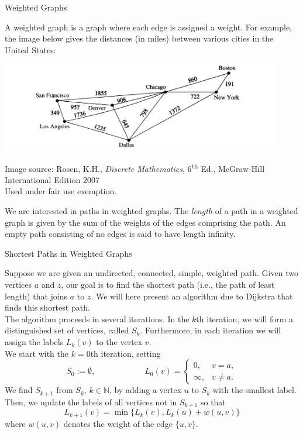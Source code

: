 \documentclass[smaller,hyperref={CJKbookmarks=true}]{beamer}
\newcommand{\N}{\mathbb{N}} \newcommand{\Z}{\mathbb{Z}} \newcommand{\Q}{\mathbb{Q}}
\begin{document}
\begin{frame}[t]{Weighted Graphs}
\begin{spacing}{0.95}
\vspace*{-7pt}
A weighted graph is a graph where each edge is assigned a weight. For
example, the image below gives the distances (in miles) between various
cities in the United States:\\
\begin{center}
\begin{spacing}{0.5}
\includegraphics[width=\textwidth,height=110pt]{route}
\begin{tiny}
Image source: Rosen, K.H., \emph{Discrete Mathematics}, 6\textsuperscript{th} Ed., McGraw-Hill International Edition 2007\\
Used under fair use exemption.
\end{tiny}
\end{spacing}
\end{center}
\vspace*{-6pt}
We are interested in paths in weighted graphs. The \emph{length} of a path in a
weighted graph is given by the sum of the weights of the edges comprising
the path. An empty path consisting of no edges is said to have length
infinity.
\end{spacing}
\end{frame}
\begin{frame}[t]{Shortest Paths in Weighted Graphs}
\begin{spacing}{0.9}
Suppose we are given an undirected, connected, simple, weighted path. Given two vertices $a$ and $z$, our goal is to find the shortest path (i.e., the path of least length) that joins $a$ to $z$. We will here present an algorithm due to Dijkstra that finds this shortest path.\\[6pt]
The algorithm proceeds in several iterations. In the $k$th iteration, we will form a distinguished set of vertices, called $S_k$. Furthermore, in each iteration we will assign the labels $L_k(v)$ to the vertex $v$.\\[6pt]
We start with the $k=0$th iteration, setting
\[S_0:=\emptyset,\qquad\qquad\qquad
L_0(v)=\begin{cases}
         0, & v=a, \\
         \infty, & v\neq a.
       \end{cases}\]
We find $S_{k+1}$ from $S_k,\,k\in\N$, by adding a vertex $u$ to $S_k$ with the smallest label. Then, we update the labels of all vertices not in $S_{k+1}$ so that
\begin{equation}\label{3.2.2}
L_{k+1}(v)=\min\big\{L_k(v),L_k(u)+w(u,v)\big\}
\end{equation}
where $w(u,v)$ denotes the weight of the edge $\{u,v\}$.
\end{spacing}
\end{frame}
\end{document}
